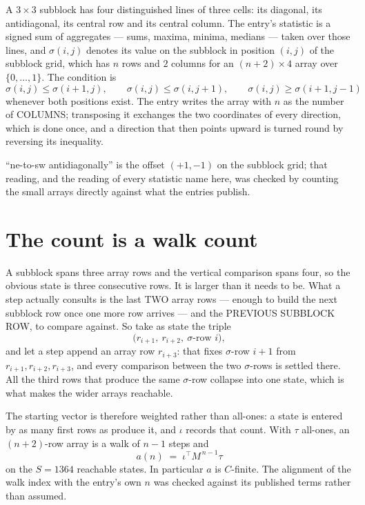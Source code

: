 \documentclass[11pt,a4paper]{article}
\theoremstyle{plain}
\theoremstyle{definition}
\begin{document}
A $3\times3$ subblock has four distinguished lines of three cells: its diagonal, its
antidiagonal, its central row and its central column. The entry's statistic is a signed sum of
aggregates --- sums, maxima, minima, medians --- taken over those lines, and $\sigma(i,j)$
denotes its value on the subblock in position $(i,j)$ of the subblock grid, which has $n$ rows
and $2$ columns for an $(n+2)\times4$ array over $\{0,\dots,1\}$. The condition is
\[
\sigma(i,j)\le\sigma(i+1,j),\qquad \sigma(i,j)\le\sigma(i,j+1),\qquad \sigma(i,j)\ge\sigma(i+1,j-1)
\]
whenever both positions exist. The entry writes the array with $n$ as the number of COLUMNS; transposing it exchanges the two coordinates of every direction, which is done once, and a direction that then points upward is turned round by reversing its inequality.

``ne-to-sw antidiagonally'' is the offset $(+1,-1)$ on the subblock grid; that reading, and
the reading of every statistic name here, was checked by counting the small arrays directly
against what the entries publish.

\section{The count is a walk count}

A subblock spans three array rows and the vertical comparison spans four, so the obvious state
is three consecutive rows. It is larger than it needs to be. What a step actually consults is
the last TWO array rows --- enough to build the next subblock row once one more row arrives ---
and the PREVIOUS SUBBLOCK ROW, to compare against. So take as state the triple
\[
\bigl(r_{i+1},\ r_{i+2},\ \sigma\text{-row }i\bigr),
\]
and let a step append an array row $r_{i+3}$: that fixes $\sigma$-row $i+1$ from
$r_{i+1},r_{i+2},r_{i+3}$, and every comparison between the two $\sigma$-rows is settled
there. All the third rows that produce the same $\sigma$-row collapse into one state, which is
what makes the wider arrays reachable.

The starting vector is therefore weighted rather than all-ones: a state is entered by as many
first rows as produce it, and $\iota$ records that count. With $\tau$ all-ones, an
$(n+2)$-row array is a walk of $n-1$ steps and
\[
a(n)\;=\;\iota^{\!\top}M^{\,n-1}\tau
\]
on the $S=1364$ reachable states. In particular $a$ is $C$-finite. The alignment of the walk
index with the entry's own $n$ was checked against its published terms rather than assumed.
\end{document}
